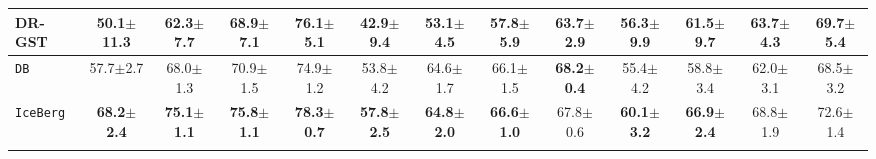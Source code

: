 \begin{table*}[]
{\begin{tabular}{l|cccc|cccc|cccc}
DR-GST  & 50.1{\small$\pm$11.3}   & 62.3{\small$\pm$7.7} & 68.9{\small$\pm$7.1}    & 76.1{\small$\pm$5.1} & 42.9{\small$\pm$9.4}    & 53.1{\small$\pm$4.5} & 57.8{\small$\pm$5.9}   & 63.7{\small$\pm$2.9}  & 56.3{\small$\pm$9.9}  & 61.5{\small$\pm$9.7}  & 63.7{\small$\pm$4.3} & 69.7{\small$\pm$5.4}  \\ \hline
\rowcolor{gray!10}\texttt{DB}      & 57.7{\small$\pm$2.7} & 68.0{\small$\pm$1.3} & 70.9{\small$\pm$1.5} & 74.9{\small$\pm$1.2} & 53.8{\small$\pm$4.2} & 64.6{\small$\pm$1.7} & 66.1{\small$\pm$1.5} & \textbf{68.2{\small$\pm$0.4}} & 55.4{\small$\pm$4.2} & 58.8{\small$\pm$3.4} & 62.0{\small$\pm$3.1} & 68.5{\small$\pm$3.2} \\
\rowcolor{gray!10}\texttt{IceBerg} & \textbf{68.2{\small$\pm$2.4}} & \textbf{75.1{\small$\pm$1.1}}                    & \textbf{75.8{\small$\pm$1.1}}                    & \textbf{78.3{\small$\pm$0.7}}                     & \textbf{57.8{\small$\pm$2.5}}                    & \textbf{64.8{\small$\pm$2.0}}                    & \textbf{66.6{\small$\pm$1.0}}                    & 67.8{\small$\pm$0.6}                     & \textbf{60.1{\small$\pm$3.2}}                    & \textbf{66.9{\small$\pm$2.4}}                    & 68.8{\small$\pm$1.9}                     & 72.6{\small$\pm$1.4}                    \\ \Xhline{1.2pt}
\end{tabular}}
\label{tab:fsgl}
\end{table*}



